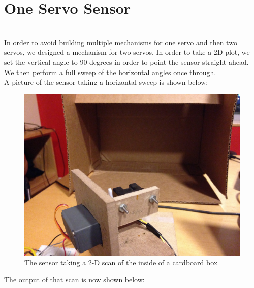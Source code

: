 \documentclass{article}
\begin{document}
\section{One Servo Sensor} \ \\
%
In order to avoid building multiple mechanisms for one servo and then two servos, we designed a mechanism for two servos. In order to take a 2D plot, we set the vertical angle to 90 degrees in order to point the sensor straight ahead. We then perform a full sweep of the horizontal angles once through. \\

A picture of the sensor taking a horizontal sweep is shown below: \\

\begin{figure}[h!]
\begin{center}
\includegraphics[scale=0.08]{2dscanpic.JPG}
\caption{The sensor taking a 2-D scan of the inside of a cardboard box}
\end{center}
\end{figure}
\newpage

The output of that scan is now shown below:
\end{document}
